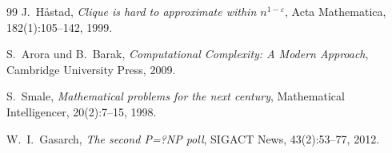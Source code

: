 \documentclass[12pt,a4paper]{amsart}
\theoremstyle{definition}
\begin{document}
\begin{thebibliography}{99}
J.~H{\aa}stad,
\textit{Clique is hard to approximate within $n^{1-\varepsilon}$},
Acta Mathematica, 182(1):105--142, 1999.

S.~Arora und B.~Barak,
\textit{Computational Complexity: A Modern Approach},
Cambridge University Press, 2009.

S.~Smale,
\textit{Mathematical problems for the next century},
Mathematical Intelligencer, 20(2):7--15, 1998.

W.~I.\ Gasarch,
\textit{The second P=?NP poll},
SIGACT News, 43(2):53--77, 2012.

\end{thebibliography}
\end{document}
